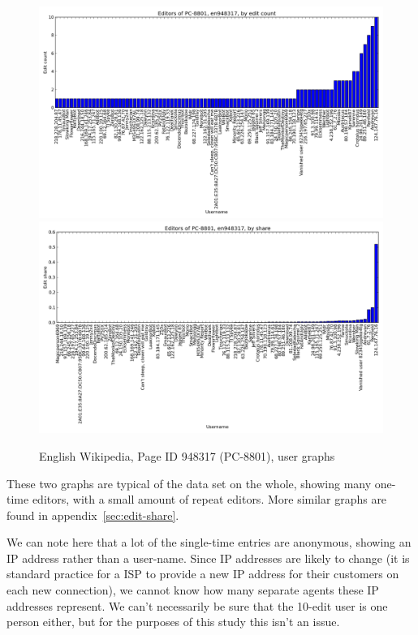 \begin{figure}
  \centering
  \includegraphics[width=1\linewidth]{img/editshare/pc8801count.png}
  \newline
  \includegraphics[width=1\linewidth]{img/editshare/pc8801share.png}
  \caption{English Wikipedia, Page ID 948317 (PC-8801), user graphs}
  \label{fig:average-share}
\end{figure}

These two graphs are typical of the data set on the whole, showing
many one-time editors, with a small amount of repeat editors. More
similar graphs are found in appendix~\ref{sec:edit-share}.

We can note here that a lot of the single-time entries are anonymous,
showing an IP address rather than a user-name. Since IP addresses are
likely to change (it is standard practice for a ISP to provide a new
IP address for their customers on each new connection), we cannot know
how many separate agents these IP addresses represent. We can't
necessarily be sure that the 10-edit user is one person either, but
for the purposes of this study this isn't an issue.

